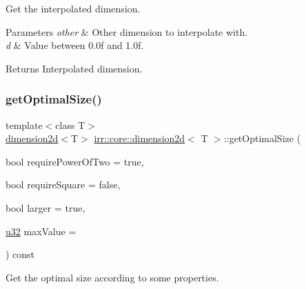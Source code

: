 Get the interpolated dimension. 


\begin{DoxyParams}{Parameters}
{\em other} & Other dimension to interpolate with. \\
\hline
{\em d} & Value between 0.\+0f and 1.\+0f. \\
\hline
\end{DoxyParams}
\begin{DoxyReturn}{Returns}
Interpolated dimension. 
\end{DoxyReturn}
\mbox{\label{classirr_1_1core_1_1dimension2d_a5861f95f79fe5a23a0f2d867b6ca70fc}} 
\subsubsection{\texorpdfstring{get\+Optimal\+Size()}{getOptimalSize()}\hspace{0.1cm}{\footnotesize\ttfamily [1/2]}}
{\footnotesize\ttfamily template$<$class T$>$ \\
\hyperlink{classirr_1_1core_1_1dimension2d}{dimension2d}$<$T$>$ \hyperlink{classirr_1_1core_1_1dimension2d}{irr\+::core\+::dimension2d}$<$ T $>$\+::get\+Optimal\+Size (\begin{DoxyParamCaption}\item[{bool}]{require\+Power\+Of\+Two = {\ttfamily true},  }\item[{bool}]{require\+Square = {\ttfamily false},  }\item[{bool}]{larger = {\ttfamily true},  }\item[{\hyperlink{namespaceirr_a0416a53257075833e7002efd0a18e804}{u32}}]{max\+Value = {} }\end{DoxyParamCaption}) const\hspace{0.3cm}{\ttfamily [inline]}}



Get the optimal size according to some properties. 

